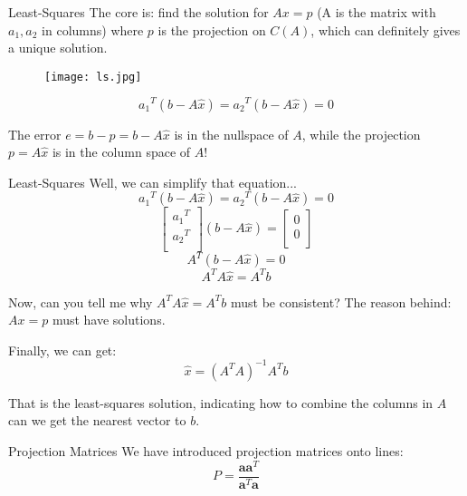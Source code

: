 \documentclass{beamer}
\begin{document}
\begin{frame}{Least-Squares}
The core is: find the solution for $Ax=p$ (A is the matrix with $a_1,a_2$ in columns) where $p$ is the projection on $C(A)$, which can definitely gives a unique solution.

\begin{figure}
    \centering
    \texttt{[image: ls.jpg]}
\end{figure}
\begin{equation*}
    {a_1}^T\left( b-A\hat{x} \right) ={a_2}^T\left( b-A\hat{x} \right) =0
\end{equation*}

The error $e=b-p=b-A\hat{x}$ is in the nullspace of $A$, while the projection $p=A\hat{x}$ is in the column space of $A$!
\end{frame}

\begin{frame}{Least-Squares}
Well, we can simplify that equation...
    \begin{equation*}
        {a_1}^T\left( b-A\hat{x} \right) ={a_2}^T\left( b-A\hat{x} \right) =0
    \end{equation*}
\begin{equation*}
    \left[ \begin{array}{c}
        {a_1}^T\\
        {a_2}^T\\
    \end{array} \right] \left( b-A\hat{x} \right) =\left[ \begin{array}{c}
        0\\
        0\\
    \end{array} \right]
\end{equation*}
\begin{equation*}
    A^T\left( b-A\hat{x} \right) =0
\end{equation*}
\begin{equation*}
    A^TA\hat{x} =A^Tb
\end{equation*}

Now, can you tell me why $A^TA\hat{x} =A^Tb$ must be consistent? The reason behind: $Ax=p$ must have solutions.

\vspace{3pt}
Finally, we can get:
\begin{equation*}
    \hat{x} =(A^TA)^{-1}A^Tb
\end{equation*}

That is the least-squares solution, indicating how to combine the columns in $A$ can we get the nearest vector to $b$.
\end{frame}

\begin{frame}{Projection Matrices}
We have introduced projection matrices onto lines:
\begin{equation*}
    P=\frac{\mathbf{aa}^T}{\mathbf{a}^T\mathbf{a}}
\end{equation*}

\end{frame}
\end{document}
